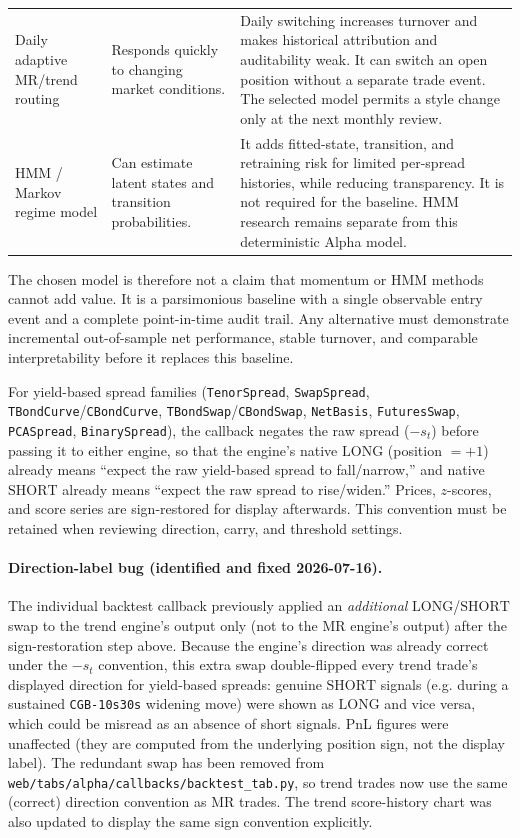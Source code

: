 {\begin{longtable}{p{} p{} p{}}
Daily adaptive MR/trend routing & Responds quickly to changing market conditions. & Daily switching increases turnover and makes historical attribution and auditability weak. It can switch an open position without a separate trade event. The selected model permits a style change only at the next monthly review. \\
HMM / Markov regime model & Can estimate latent states and transition probabilities. & It adds fitted-state, transition, and retraining risk for limited per-spread histories, while reducing transparency. It is not required for the baseline. HMM research remains separate from this deterministic Alpha model. \\
\end{longtable}
}

The chosen model is therefore not a claim that momentum or HMM methods cannot add
value. It is a parsimonious baseline with a single observable entry event and a
complete point-in-time audit trail. Any alternative must demonstrate incremental
out-of-sample net performance, stable turnover, and comparable interpretability
before it replaces this baseline.

For yield-based spread families (\texttt{TenorSpread}, \texttt{SwapSpread},
\texttt{TBondCurve}/\texttt{CBondCurve}, \texttt{TBondSwap}/\texttt{CBondSwap},
\texttt{NetBasis}, \texttt{FuturesSwap}, \texttt{PCASpread}, \texttt{BinarySpread}),
the callback negates the raw spread ($-s_t$) before passing it to either engine, so
that the engine's native $\mathrm{LONG}$ (position $=+1$) already means ``expect the
raw yield-based spread to fall/narrow,'' and native $\mathrm{SHORT}$ already means
``expect the raw spread to rise/widen.'' Prices, $z$-scores, and score series are
sign-restored for display afterwards. This convention must be retained when
reviewing direction, carry, and threshold settings.

\paragraph{Direction-label bug (identified and fixed 2026-07-16).} The individual
backtest callback previously applied an \emph{additional} $\mathrm{LONG}$/$\mathrm{SHORT}$
swap to the trend engine's output only (not to the MR engine's output) after the
sign-restoration step above. Because the engine's direction was already correct
under the $-s_t$ convention, this extra swap double-flipped every trend trade's
displayed direction for yield-based spreads: genuine $\mathrm{SHORT}$ signals (e.g.
during a sustained \texttt{CGB-10s30s} widening move) were shown as $\mathrm{LONG}$
and vice versa, which could be misread as an absence of short signals. PnL figures
were unaffected (they are computed from the underlying position sign, not the
display label). The redundant swap has been removed from
\texttt{web/tabs/alpha/callbacks/backtest\_tab.py}, so trend trades now use the same
(correct) direction convention as MR trades. The trend score-history chart was also
updated to display the same sign convention explicitly.


